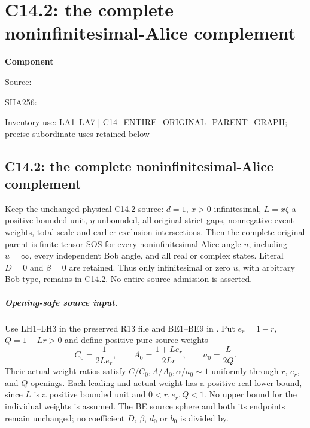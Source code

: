 \chapter{C14.2: the complete noninfinitesimal-Alice complement}
\label{component:pb0d9d28d0849}
\noindent\textbf{Component }\par
{\small\noindent Source: \par}
{\small\noindent SHA256: \par}
{\small\noindent Inventory use: LA1--LA7 | C14\_\allowbreak{}ENTIRE\_\allowbreak{}ORIGINAL\_\allowbreak{}PARENT\_\allowbreak{}GRAPH; precise subordinate uses retained below\par}
\medskip
\section{C14.2: the complete noninfinitesimal-Alice complement}
\label{pb0d9d28d0849:sec:r18-c142-remote}

\begin{proposition}
Keep the unchanged physical C14.2 source: $d=1$, $x>0$
infinitesimal, $L=x\zeta$ a positive bounded unit, $\eta$ unbounded,
all original strict gaps, nonnegative event weights, total-scale and
earlier-exclusion intersections.  Then the complete original parent
is finite tensor SOS for every noninfinitesimal Alice angle $u$,
including $u=\infty$, every independent Bob angle, and all real or
complex states.  Literal $D=0$ and $\beta=0$ are retained.  Thus
only infinitesimal or zero $u$, with arbitrary Bob type, remains in
C14.2.  No entire-source admission is asserted.
\end{proposition}

\paragraph{Opening-safe source input.}
Use LH1--LH3 in the preserved R13 file
 and BE1--BE9
in .
Put $e_r=1-r$, $Q=1-Lr>0$ and define positive pure-source weights
\[
 C_0=\frac1{2Le_r},\qquad
 A_0=\frac{1+Le_r}{2Lr},\qquad
 a_0=\frac L{2Q}.
                                                               \tag{LA1}
\]
Their actual-weight ratios satisfy
$C/C_0,A/A_0,\alpha/a_0\sim1$ uniformly through $r$, $e_r$,
and $Q$ openings.  Each leading and actual weight has a positive
real lower bound, since $L$ is a positive bounded unit and
$0<r,e_r,Q<1$.  No upper bound for the individual weights is assumed.
The BE source sphere and both its endpoints remain unchanged; no
coefficient $D$, $\beta$, $d_0$ or $b_0$ is divided by.

